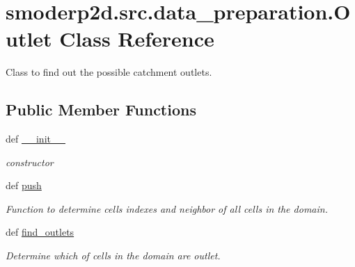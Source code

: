 \hypertarget{classsmoderp2d_1_1src_1_1data__preparation_1_1Outlet}{\section{smoderp2d.\-src.\-data\-\_\-preparation.\-Outlet Class Reference}
\label{classsmoderp2d_1_1src_1_1data__preparation_1_1Outlet}
}


Class to find out the possible catchment outlets.  


\subsection*{Public Member Functions}
\begin{DoxyCompactItemize}
\item 
\hypertarget{classsmoderp2d_1_1src_1_1data__preparation_1_1Outlet_a38d7640690632fb70da2cb968d1c4320}{def \hyperlink{classsmoderp2d_1_1src_1_1data__preparation_1_1Outlet_a38d7640690632fb70da2cb968d1c4320}{\-\_\-\-\_\-init\-\_\-\-\_\-}}\label{classsmoderp2d_1_1src_1_1data__preparation_1_1Outlet_a38d7640690632fb70da2cb968d1c4320}

\begin{DoxyCompactList}\small\item\em constructor \end{DoxyCompactList}\item 
\hypertarget{classsmoderp2d_1_1src_1_1data__preparation_1_1Outlet_a3371e5c1451c87f332ac83cdf8196bb1}{def \hyperlink{classsmoderp2d_1_1src_1_1data__preparation_1_1Outlet_a3371e5c1451c87f332ac83cdf8196bb1}{push}}\label{classsmoderp2d_1_1src_1_1data__preparation_1_1Outlet_a3371e5c1451c87f332ac83cdf8196bb1}

\begin{DoxyCompactList}\small\item\em Function to determine cells indexes and neighbor of all cells in the domain. \end{DoxyCompactList}\item 
def \hyperlink{classsmoderp2d_1_1src_1_1data__preparation_1_1Outlet_a2243e5b391c4db099fc2876f09b7ef28}{find\-\_\-outlets}
\begin{DoxyCompactList}\small\item\em Determine which of cells in the domain are outlet. \end{DoxyCompactList}\end{DoxyCompactItemize}
